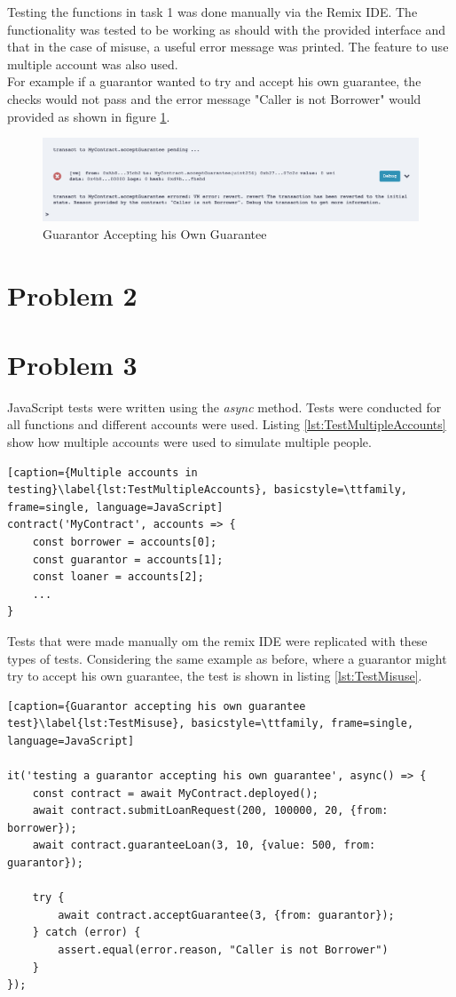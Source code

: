 \documentclass[a4paper, 12pt]{article}
\begin{document}
Testing the functions in task 1 was done manually via the Remix IDE. The functionality was tested to be working as should with the provided interface and that in the case of misuse, a useful error message was printed. The feature to use multiple account was also used.
\\
For example if a guarantor wanted to try and accept his own guarantee, the checks would not pass and the error message "Caller is not Borrower" would provided as shown in figure \ref{fig:error}.

\begin{figure}[h!]
	\centering
	\includegraphics[width=\textwidth]{./Images/error}
	\caption{Guarantor Accepting his Own Guarantee}
	\label{fig:error}
\end{figure}


\section{Problem 2}
\section{Problem 3}
JavaScript tests were written using the \textit{async} method. Tests were conducted for all functions and different accounts were used. Listing \ref{lst:TestMultipleAccounts} show how multiple accounts were used to simulate multiple people. 

\begin{lstlisting}[caption={Multiple accounts in testing}\label{lst:TestMultipleAccounts}, basicstyle=\ttfamily, frame=single, language=JavaScript]
contract('MyContract', accounts => {
	const borrower = accounts[0];
	const guarantor = accounts[1];
	const loaner = accounts[2];
	...
}
\end{lstlisting}

Tests that were made manually om the remix IDE were replicated with these types of tests. Considering the same example as before, where a guarantor might try to accept his own guarantee, the test is shown in listing \ref{lst:TestMisuse}.

\begin{lstlisting}[caption={Guarantor accepting his own guarantee test}\label{lst:TestMisuse}, basicstyle=\ttfamily, frame=single, language=JavaScript]

it('testing a guarantor accepting his own guarantee', async() => {
	const contract = await MyContract.deployed();
	await contract.submitLoanRequest(200, 100000, 20, {from: borrower});
	await contract.guaranteeLoan(3, 10, {value: 500, from: guarantor});
	
	try {
		await contract.acceptGuarantee(3, {from: guarantor});
	} catch (error) {
		assert.equal(error.reason, "Caller is not Borrower")
	}
});

\end{lstlisting}
\end{document}
